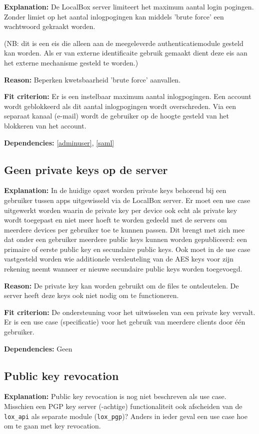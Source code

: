 \documentclass[[11pt,a4paper]{article}
\newcommand\requirement[2]{\subsection{#2}\label{#1}}
\newcommand\explanation{\noindent\textbf{Explanation: }}
\newcommand\reason{\noindent\textbf{Reason: }}
\newcommand\criterion{\noindent\textbf{Fit criterion: }}
\newcommand\dependencies{\noindent\textbf{Dependencies: }}
\begin{document}
    \explanation De LocalBox server limiteert het maximum aantal login pogingen. Zonder limiet op het aantal inlogpogingen kan middels 'brute force' een wachtwoord gekraakt worden.

    (NB: dit is een eis die alleen aan de meegeleverde authenticatiemodule gesteld kan worden. Als er van externe identificaite gebruik gemaakt dient deze eis aan het externe mechanisme gesteld te worden.)

    \reason Beperken kwetsbaarheid 'brute force' aanvallen.
    
    \criterion Er is een instelbaar maximum aantal inlogpogingen. Een account wordt geblokkeerd als dit aantal inlogpogingen wordt overschreden. Via een separaat kanaal (e-mail) wordt de gebruiker op de hoogte gesteld van het blokkeren van het account.

    \dependencies \ref{adminuser}, \ref{saml}


\requirement{privkey}{Geen private keys op de server}

    \explanation In de huidige opzet worden private keys behorend bij een gebruiker tussen apps uitgewisseld via de LocalBox server. Er moet een use case uitgewerkt worden waarin de private key per device ook echt als private key wordt toegepast en niet meer hoeft te worden gedeeld met de servers om meerdere devices per gebruiker toe te kunnen passen. Dit brengt met zich mee dat onder een gebruiker meerdere public keys kunnen worden gepubliceerd: een primaire of eerste public key en secundaire public keys. Ook moet in de use case vastgesteld worden wie additionele versleuteling van de AES keys voor zijn rekening neemt wanneer er nieuwe secundaire public keys worden toegevoegd.

    \reason De private key kan worden gebruikt om de files te ontsleutelen. De server heeft deze keys ook niet nodig om te functioneren. 
	
    \criterion De ondersteuning voor het uitwisselen van een private key vervalt. Er is een use case (specificatie) voor het gebruik van meerdere clients door \'{e}\'{e}n gebruiker.

    \dependencies Geen

\requirement{revoke}{Public key revocation}

    \explanation Public key revocation is nog niet beschreven als use case. Misschien een PGP key server (-achtige) functionaliteit ook afscheiden van de \texttt{lox\_api} als separate module (\texttt{lox\_pgp})? Anders in ieder geval een use case hoe om te gaan met key revocation.
    
\end{document}
